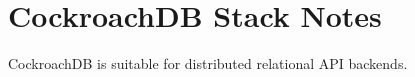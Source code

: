 \section{CockroachDB Stack Notes}

CockroachDB is suitable for distributed relational API backends.
